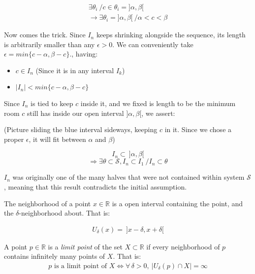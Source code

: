 \begin{bookproof}
\begin{align*}
\exists \theta_i \ / c \in \theta_i = ]\alpha, \beta[\\
\rightarrow \exists \theta_i = ]\alpha, \beta[ \ / \alpha < c < \beta
\end{align*}

Now comes the trick. Since $I_n$ keeps shrinking alongside the sequence, its length is arbitrarily smaller than any $\epsilon > 0$. We can conveniently take $\epsilon = min\{c - \alpha, \beta - c \}.$, having:

\begin{itemize}
	\item $c \in I_n$ (Since it is in any interval $I_k$)
	\item $|I_n| < min\{c - \alpha, \beta - c \}$
\end{itemize}

Since $I_n$ is tied to keep $c$ inside it, and we fixed is length to be the minimum room $c$ still has inside our open interval $]\alpha, \beta[$, we assert:



\begin{center}
\begin{footnotesize}
(Picture sliding the blue interval sideways, keeping $c$ in it. Since we chose a proper $\epsilon$, it will fit between $\alpha$ and $\beta$)
\end{footnotesize}
\end{center}

$$I_n \subset \ ]\alpha, \beta[$$
$$\Rightarrow \exists \theta \subset \mathcal{S}, I_n \subset I_1 \ / I_n \subset \theta$$

$I_n$ was originally one of the many halves that were not contained within system $\mathcal{S}$, meaning that this result contradicts the initial assumption.
\end{bookproof}

\begin{definition}
The neighborhood of a point $x \in \mathbb{R}$ is a open interval containing the point, and the $\delta$-neighborhood about. That is:

\begin{align*}
U_\delta(x) = \ ] x - \delta, x + \delta [
\end{align*}

\end{definition}

\begin{definition}
A point $p \in \mathbb{R}$ is a \textit{limit point} of the set $X \subset \mathbb{R}$ if every neighborhood of $p$ contains infinitely many points of $X$. That is:
\begin{align*}
p \text{ is a limit point of } X \iff \forall\, \delta > 0,\ \left| U_\delta(p) \cap X \right| = \infty
\end{align*}
\end{definition}

